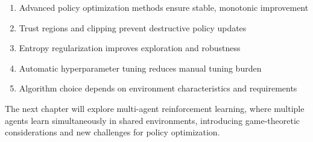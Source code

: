 \begin{keyideabox}
\begin{enumerate}
    \item Advanced policy optimization methods ensure stable, monotonic improvement
    \item Trust regions and clipping prevent destructive policy updates
    \item Entropy regularization improves exploration and robustness
    \item Automatic hyperparameter tuning reduces manual tuning burden
    \item Algorithm choice depends on environment characteristics and requirements
\end{enumerate}
\end{keyideabox}

The next chapter will explore multi-agent reinforcement learning, where multiple agents learn simultaneously in shared environments, introducing game-theoretic considerations and new challenges for policy optimization.